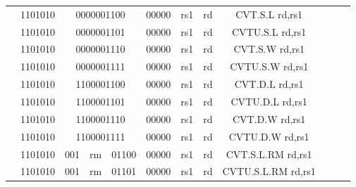 \begin{table}[p]
\begin{small}
\begin{center}
\begin{tabular}{rcccccccccccl}
&
\multicolumn{1}{|c|}{1101010} &
\multicolumn{4}{c|}{0000001100} &
\multicolumn{1}{c|}{00000} &
\multicolumn{1}{c|}{rs1} &
\multicolumn{1}{c|}{rd} & CVT.S.L rd,rs1 \\
\cline{2-9}
  

&
\multicolumn{1}{|c|}{1101010} &
\multicolumn{4}{c|}{0000001101} &
\multicolumn{1}{c|}{00000} &
\multicolumn{1}{c|}{rs1} &
\multicolumn{1}{c|}{rd} & CVTU.S.L rd,rs1 \\
\cline{2-9}
  

&
\multicolumn{1}{|c|}{1101010} &
\multicolumn{4}{c|}{0000001110} &
\multicolumn{1}{c|}{00000} &
\multicolumn{1}{c|}{rs1} &
\multicolumn{1}{c|}{rd} & CVT.S.W rd,rs1 \\
\cline{2-9}
  

&
\multicolumn{1}{|c|}{1101010} &
\multicolumn{4}{c|}{0000001111} &
\multicolumn{1}{c|}{00000} &
\multicolumn{1}{c|}{rs1} &
\multicolumn{1}{c|}{rd} & CVTU.S.W rd,rs1 \\
\cline{2-9}
  

&
\multicolumn{1}{|c|}{1101010} &
\multicolumn{4}{c|}{1100001100} &
\multicolumn{1}{c|}{00000} &
\multicolumn{1}{c|}{rs1} &
\multicolumn{1}{c|}{rd} & CVT.D.L rd,rs1 \\
\cline{2-9}
  

&
\multicolumn{1}{|c|}{1101010} &
\multicolumn{4}{c|}{1100001101} &
\multicolumn{1}{c|}{00000} &
\multicolumn{1}{c|}{rs1} &
\multicolumn{1}{c|}{rd} & CVTU.D.L rd,rs1 \\
\cline{2-9}
  

&
\multicolumn{1}{|c|}{1101010} &
\multicolumn{4}{c|}{1100001110} &
\multicolumn{1}{c|}{00000} &
\multicolumn{1}{c|}{rs1} &
\multicolumn{1}{c|}{rd} & CVT.D.W rd,rs1 \\
\cline{2-9}
  

&
\multicolumn{1}{|c|}{1101010} &
\multicolumn{4}{c|}{1100001111} &
\multicolumn{1}{c|}{00000} &
\multicolumn{1}{c|}{rs1} &
\multicolumn{1}{c|}{rd} & CVTU.D.W rd,rs1 \\
\cline{2-9}
  

&
\multicolumn{1}{|c|}{1101010} &
\multicolumn{1}{c|}{001} &
\multicolumn{1}{c|}{rm} &
\multicolumn{2}{c|}{01100} &
\multicolumn{1}{c|}{00000} &
\multicolumn{1}{c|}{rs1} &
\multicolumn{1}{c|}{rd} & CVT.S.L.RM rd,rs1 \\
\cline{2-9}
  

&
\multicolumn{1}{|c|}{1101010} &
\multicolumn{1}{c|}{001} &
\multicolumn{1}{c|}{rm} &
\multicolumn{2}{c|}{01101} &
\multicolumn{1}{c|}{00000} &
\multicolumn{1}{c|}{rs1} &
\multicolumn{1}{c|}{rd} & CVTU.S.L.RM rd,rs1 \\
\cline{2-9}
  


\end{tabular}
\end{center}
\end{small}
\end{table}
